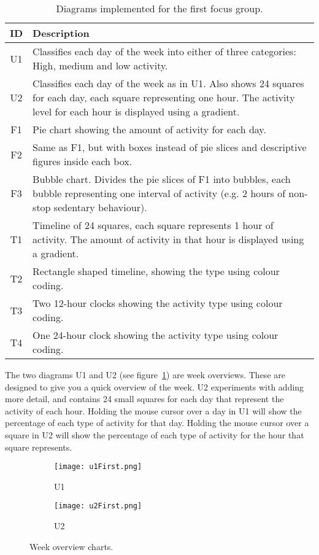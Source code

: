 \begin{table}[h!]
  \begin{center}
  \begin{tabular}{|c|p{10cm}|}
    \hline
    \textbf{ID} & \textbf{Description} \\ \hline
    U1 & Classifies each day of the week into either of three categories: High, medium and low activity. \\ \hline
    U2 & Classifies each day of the week as in U1. Also shows 24 squares for each day, each square representing one hour. The activity level for each hour is displayed using a gradient. \\ \hline
    F1 & Pie chart showing the amount of activity for each day. \\ \hline
    F2 & Same as F1, but with boxes instead of pie slices and descriptive figures inside each box. \\ \hline
    F3 & Bubble chart. Divides the pie slices of F1 into bubbles, each bubble representing one interval of activity (e.g. 2 hours of non-stop sedentary behaviour). \\ \hline
    T1 & Timeline of 24 squares, each square represents 1 hour of activity. The amount of activity in that hour is displayed using a gradient. \\ \hline
    T2 & Rectangle shaped timeline, showing the type using colour coding. \\ \hline
    T3 & Two 12-hour clocks showing the activity type using colour coding. \\ \hline
    T4 & One 24-hour clock showing the activity type using colour coding. \\ \hline
  \end{tabular}
  \end{center}
  \caption{Diagrams implemented for the first focus group.}
  \label{tab:runProtDesc1}
\end{table}

The two diagrams U1 and U2 (see figure~\ref{fig:uFirst}) are week overviews. These are designed to give you a quick overview of the week. U2 experiments with adding more detail, and contains 24 small squares for each day that represent the activity of each hour. Holding the mouse cursor over a day in U1 will show the percentage of each type of activity for that day. Holding the mouse cursor over a square in U2 will show the percentage of each type of activity for the hour that square represents.

\begin{figure}[h!]
  \centering
  \begin{subfigure}[b]{0.45\textwidth}
    \centering
    \texttt{[image: u1First.png]}
    \caption{U1}
  \end{subfigure}
  \begin{subfigure}[b]{0.45\textwidth}
    \centering
    \texttt{[image: u2First.png]}
    \caption{U2}
  \end{subfigure}
  \caption{Week overview charts.}
  \label{fig:uFirst}
\end{figure}

